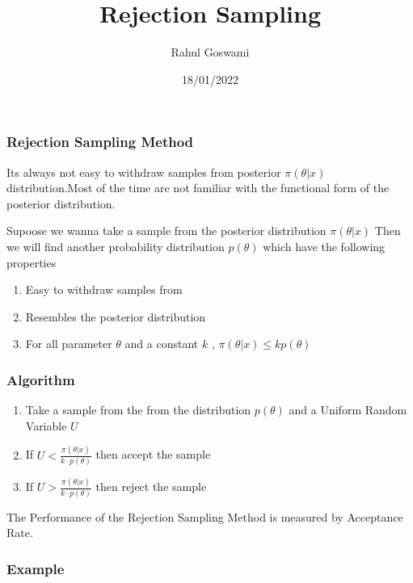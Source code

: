 \documentclass[
]{article}
\title{Rejection Sampling}
\author{Rahul Goswami}
\date{18/01/2022}
\providecommand{\tightlist}{%
  \setlength{\itemsep}{0pt}\setlength{\parskip}{0pt}}
\begin{document}
\maketitle

\hypertarget{rejection-sampling-method}{%
\subsubsection{Rejection Sampling
Method}\label{rejection-sampling-method}}

Its always not easy to withdraw samples from posterior \(\pi(\theta|x)\)
distribution.Most of the time are not familiar with the functional form
of the posterior distribution.

Supoose we wanna take a sample from the posterior distribution
\(\pi(\theta|x)\) Then we will find another probability distribution
\(p(\theta)\) which have the following properties

\begin{enumerate}
\def\labelenumi{\arabic{enumi}.}
\tightlist
\item
  Easy to withdraw samples from
\item
  Resembles the posterior distribution
\item
  For all parameter \(\theta\) and a constant \(k\) ,
  \(\pi(\theta|x) \leq k p(\theta)\)
\end{enumerate}

\hypertarget{algorithm}{%
\subsubsection{Algorithm}\label{algorithm}}

\begin{enumerate}
\def\labelenumi{\arabic{enumi}.}
\tightlist
\item
  Take a sample from the from the distribution \(p(\theta)\) and a
  Uniform Random Variable \(U\)
\item
  If \(U < \frac{\pi(\theta|x)}{k \cdot p(\theta)}\) then accept the
  sample
\item
  If \(U > \frac{\pi(\theta|x)}{k \cdot p(\theta)}\) then reject the
  sample
\end{enumerate}

The Performance of the Rejection Sampling Method is measured by
Acceptance Rate.

\hypertarget{example}{%
\subsubsection{Example}\label{example}}
\end{document}
